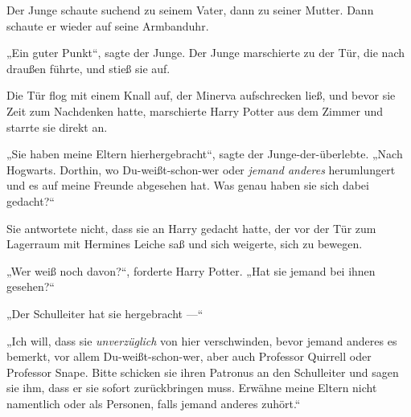 Der Junge schaute suchend zu seinem Vater, dann zu seiner Mutter. Dann schaute er wieder auf seine Armbanduhr.


„Ein guter Punkt“, sagte der Junge. Der Junge marschierte zu der Tür, die nach draußen führte, und stieß sie auf.

\later

Die Tür flog mit einem Knall auf, der Minerva aufschrecken ließ, und bevor sie Zeit zum Nachdenken hatte, marschierte Harry Potter aus dem Zimmer und starrte sie direkt an.

„Sie haben meine Eltern hierhergebracht“, sagte der Junge-der-überlebte.
„Nach Hogwarts. Dorthin, wo Du-weißt-schon-wer oder \emph{jemand anderes} herumlungert und es auf meine Freunde abgesehen hat. Was genau haben sie sich dabei gedacht?“

Sie antwortete nicht, dass sie an Harry gedacht hatte, der vor der Tür zum Lagerraum mit Hermines Leiche saß und sich weigerte, sich zu bewegen.

„Wer weiß noch davon?“, forderte Harry Potter.
„Hat sie jemand bei ihnen gesehen?“

„Der Schulleiter hat sie hergebracht —“

„Ich will, dass sie \emph{unverzüglich} von hier verschwinden, bevor jemand anderes es bemerkt, vor allem Du-weißt-schon-wer, aber auch Professor Quirrell oder Professor Snape. Bitte schicken sie ihren Patronus an den Schulleiter und sagen sie ihm, dass er sie sofort zurückbringen muss. Erwähne meine Eltern nicht namentlich oder als Personen, falls jemand anderes zuhört.“

